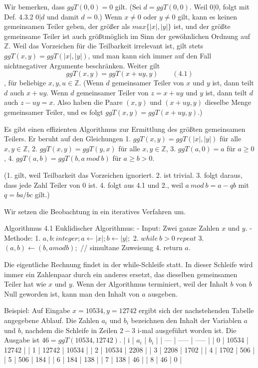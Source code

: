 \documentclass[a4paper]{article}
\begin{document}
\begin{multicols}{3}
Wir bemerken, dass $ggT(0,0) = 0$ gilt. (Sei $d = ggT(0,0)$. Weil $0|0$, folgt mit Def. 4.3.2 $0|d$ und damit $d=0$.) Wenn $x\not= 0$ oder $y\not= 0$ gilt, kann es keinen gemeinsamen Teiler geben, der größer als $max\{|x|,|y|\}$ ist, und der größte gemeinsame Teiler ist auch größtmöglich im Sinn der gewöhnlichen Ordnung auf $\mathbb{Z}$. Weil das Vorzeichen für die Teilbarkeit irrelevant ist, gilt stets $ggT(x,y) = ggT(|x|,|y|)$, und man kann sich immer auf den Fall nichtnegativer Argumente beschränken. Weiter gilt $$ggT(x,y) = ggT(x+uy,y) \quad\quad(4.1)$$, für beliebige $x,y,u\in\mathbb{Z}$. (Wenn $d$ gemeinsamer Teiler von $x$ und $y$ ist, dann teilt $d$ auch $x+uy$. Wenn $d$ gemeinsamer Teiler von $z=x+uy$ und $y$ ist, dann teilt $d$ auch $z-uy =x$. Also haben die Paare $(x,y)$ und $(x+uy,y)$ dieselbe Menge gemeinsamer Teiler, und es folgt $ggT(x,y) = ggT(x+uy,y)$.)

Es gibt einen effizienten Algorithmus zur Ermittlung des größten gemeinsamen Teilers. Er beruht auf den Gleichungen
1. $ggT(x,y) = ggT(|x|,|y|)$ für alle $x,y\in\mathbb{Z}$,
2. $ggT(x,y) = ggT(y,x)$ für alle $x,y\in\mathbb{Z}$,
3. $ggT(a,0) =a$ für $a\geq 0$,
4. $ggT(a,b) = ggT(b,a\ mod\ b)$ für $a\geq b >0$.

(1. gilt, weil Teilbarkeit das Vorzeichen ignoriert. 2. ist trivial. 3. folgt daraus, dass jede Zahl Teiler von $0$ ist. 4. folgt aus 4.1 und 2., weil $a\ mod\ b=a-qb$ mit $q=ba/bc$ gilt.)

Wir setzen die Beobachtung in ein iteratives Verfahren um.

Algorithmus 4.1 Euklidischer Algorithmus:
- Input: Zwei ganze Zahlen $x$ und $y$.
- Methode:
  1. $a,b:integer;a\leftarrow |x|;b\leftarrow |y|;$
  2. $while\ b> 0\ repeat$
  3. $(a,b)\leftarrow (b,amodb);$ // simultane Zuweisung
  4. return $a$.

Die eigentliche Rechnung findet in der while-Schleife statt. In dieser Schleife wird immer ein Zahlenpaar durch ein anderes ersetzt, das dieselben gemeinsamen Teiler hat wie $x$ und $y$. Wenn der Algorithmus terminiert, weil der Inhalt $b$ von $b$ Null geworden ist, kann man den Inhalt von $a$ ausgeben.

Beispiel: Auf Eingabe $x=10534, y=12742$ ergibt sich der nachstehenden Tabelle angegebene Ablauf. Die Zahlen $a_i$ und $b_i$ bezeichnen den Inhalt der Variablen $a$ und $b$, nachdem die Schleife in Zeilen $2-3$ i-mal ausgeführt worden ist. Die Ausgabe ist $46 = ggT(10534,12742)$.
| i   | $a_i$ | $b_i$ |
| --- | ----- | ----- |
| 0   | 10534 | 12742 |
| 1   | 12742 | 10534 |
| 2   | 10534 | 2208  |
| 3   | 2208  | 1702  |
| 4   | 1702  | 506   |
| 5   | 506   | 184   |
| 6   | 184   | 138   |
| 7   | 138   | 46    |
| 8   | 46    | 0     |



\end{multicols}
\end{document}
